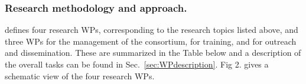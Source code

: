 
\subsubsection{Research methodology and approach.}
\label{sec:metho}


\acronym defines four research WPs, corresponding to the research topics listed above, and three WPs for the management of the consortium, for training, and for outreach and dissemination. These are summarized in the Table below and a description of the overall tasks can be found in Sec.~\ref{sec:WPdescription}. Fig 2. gives a schematic view of the four research WPs. 


